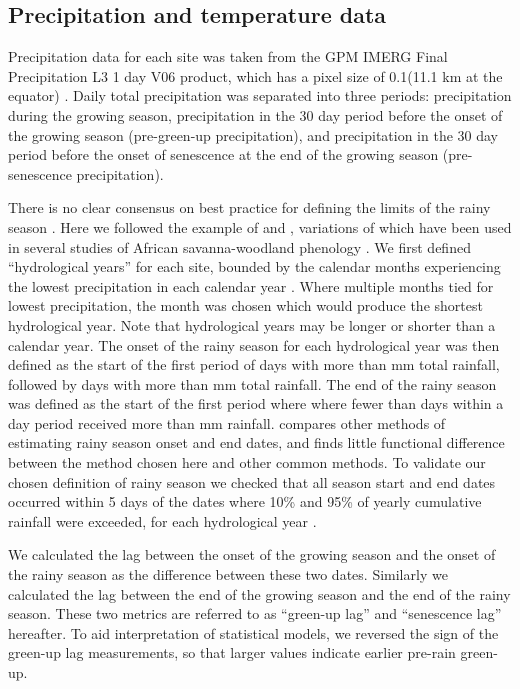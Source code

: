 \documentclass[11pt,a4paper]{article}
\begin{document}
\subsection{Precipitation and temperature data}

Precipitation data for each site was taken from the GPM IMERG Final Precipitation L3 1 day V06 product, which has a pixel size of 0.1\textdegree (11.1 km at the equator) \citep{IMERG}. Daily total precipitation was separated into three periods: precipitation during the growing season, precipitation in the 30 day period before the onset of the growing season (pre-green-up precipitation), and precipitation in the 30 day period before the onset of senescence at the end of the growing season (pre-senescence precipitation). 

There is no clear consensus on best practice for defining the limits of the rainy season \citep{Guan2014}. Here we followed the example of \citet{Stern1981} and \citet{Adole2018a}, variations of which have been used in several studies of African savanna-woodland phenology \citep{Ryan2017, Tadross2005, Mupangwa2011, Segele2005}. We first defined ``hydrological years'' for each site, bounded by the calendar months experiencing the lowest precipitation in each calendar year \citep{Ferijal2022}. Where multiple months tied for lowest precipitation, the month was chosen which would produce the shortest hydrological year. Note that hydrological years may be longer or shorter than a calendar year. The onset of the rainy season for each hydrological year was then defined as the start of the first period of \onsetPeriodOne{} days with more than \onsetPrecipOne{} mm total rainfall, followed by \onsetPeriodTwo{} days with more than \onsetPrecipTwo{} mm total rainfall. The end of the rainy season was defined as the start of the first period where where fewer than \Numberstringnum{\rainyDaysEnd} days within a \periodEnd{} day period received more than \rainyDef{} mm rainfall. \citet{Guan2014} compares other methods of estimating rainy season onset and end dates, and finds little functional difference between the method chosen here and other common methods. To validate our chosen definition of rainy season we checked that all season start and end dates occurred within 5 days of the dates where 10\% and 95\% of yearly cumulative rainfall were exceeded, for each hydrological year \citep{Adole2018a}. 

We calculated the lag between the onset of the growing season and the onset of the rainy season as the difference between these two dates. Similarly we calculated the lag between the end of the growing season and the end of the rainy season. These two metrics are referred to as ``green-up lag'' and ``senescence lag'' hereafter. To aid interpretation of statistical models, we reversed the sign of the green-up lag measurements, so that larger values indicate earlier pre-rain green-up.
\end{document}
